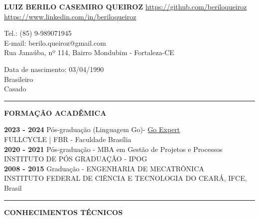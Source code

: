 \documentclass[12pt, a4paper]{article}
\newcommand{\LlinhaG}{2pt} %
\newcommand{\TlinhaG}{17cm}  %
\begin{document}

\begin{center}
	\fontsize{14}{14}
	\textbf{LUIZ BERILO CASEMIRO QUEIROZ}
	\url{https://github.com/beriloqueiroz}
	\url{https://www.linkedin.com/in/beriloqueiroz}
\end{center}

\begin{multicols}{2}
	\begin{flushleft}
		Tel.: (85) 9-989071945\\
		E-mail: berilo.queiroz@gmail.com\\
		Rua Janaúba, nº 114,
		Bairro Mondubim - Fortaleza-CE
	\end{flushleft}
	\vfill
	\begin{flushright}
		Data de nascimento: 03/04/1990\\
		Brasileiro\\
		Casado\\
	\end{flushright}
\end{multicols}


\begin{center} %
	\rule{\TlinhaG}{\LlinhaG}
\end{center}

\begin{center}
	\textbf{FORMAÇÃO ACADÊMICA}\\
\end{center}
\begin{flushleft}
	\textbf{2023 - 2024} Pós-graduação (Linguagem Go)- \href{https://goexpert.fullcycle.com.br/pos-goexpert/}{Go Expert}\\
	FULLCYCLE | FBR - Faculdade Brasília\\
	\hfill \break
	\textbf{2020 - 2021} Pós-graduação - MBA em Gestão de Projetos e Processos\\
	INSTITUTO DE PÓS GRADUAÇÃO - IPOG\\
	\hfill \break
	\textbf{2008 - 2015} Graduação - ENGENHARIA DE MECATRÔNICA\\
	INSTITUTO FEDERAL DE CIÊNCIA E TECNOLOGIA DO CEARÁ, IFCE, Brasil\\
\end{flushleft}

\begin{center}	%
	\rule{\TlinhaG}{\LlinhaG}
\end{center}

\begin{center}
	\textbf{CONHECIMENTOS TÉCNICOS}\\
\end{center}
\end{document}
